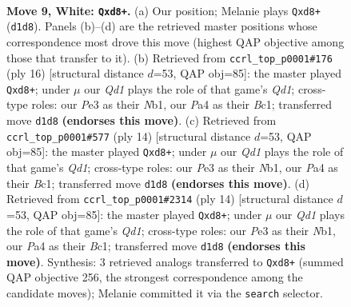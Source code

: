 \documentclass[11pt]{article}
\begin{document}
\clearpage

\begin{figure}[p]\centering
\begin{subfigure}{0.46\textwidth}\centering
\resizebox{\linewidth}{!}{%
\newchessgame
\chessboard[
  setfen={rn1qkb1r/1p3ppp/p1b1pn2/2P5/P1B5/4PN2/1P3PPP/RNBQ1RK1 w kq - 1 9},
  showmover=false,
  pgfstyle=straightmove, color=movearrow, markmove={d1-d8}
]}
\caption{}
\end{subfigure}\hfill
\begin{subfigure}{0.46\textwidth}\centering
\resizebox{\linewidth}{!}{%
\newchessgame
\chessboard[
  setfen={rnbqk2r/1p3ppp/p3pn2/2b5/2B5/4PN2/PP3PPP/RNBQ1RK1 w kq - 0 9},
  showmover=false,
  pgfstyle=straightmove, color=movearrow, markmove={d1-d8}
]}
\caption{}
\end{subfigure}
\\[4pt]
\begin{subfigure}{0.46\textwidth}\centering
\resizebox{\linewidth}{!}{%
\newchessgame
\chessboard[
  setfen={rnbqk2r/1p3ppp/p3pn2/2b5/2B5/4PN2/PP3PPP/RNBQ1RK1 w kq - 0 8},
  showmover=false,
  pgfstyle=straightmove, color=movearrow, markmove={d1-d8}
]}
\caption{}
\end{subfigure}\hfill
\begin{subfigure}{0.46\textwidth}\centering
\resizebox{\linewidth}{!}{%
\newchessgame
\chessboard[
  setfen={rnbqk2r/1p3ppp/p3pn2/2b5/2B5/4PN2/PP3PPP/RNBQ1RK1 w kq - 0 8},
  showmover=false,
  pgfstyle=straightmove, color=movearrow, markmove={d1-d8}
]}
\caption{}
\end{subfigure}
\caption{\textbf{Move 9, White: \texttt{Qxd8+}.} (a) Our position; Melanie plays \texttt{Qxd8+} (\texttt{d1d8}). Panels (b)--(d) are the retrieved master positions whose correspondence most drove this move (highest QAP objective among those that transfer to it). (b) Retrieved from \texttt{ccrl\_top\_p0001\#176} (ply 16) [structural distance $d$=53, QAP obj=85]: the master played \texttt{Qxd8+}; under $\mu$ our \emph{Qd1} plays the role of that game's \emph{Qd1}; cross-type roles: our \emph{P}e3 as their \emph{N}b1, our \emph{P}a4 as their \emph{B}c1; transferred move \texttt{d1d8} \textbf{(endorses this move)}. (c) Retrieved from \texttt{ccrl\_top\_p0001\#577} (ply 14) [structural distance $d$=53, QAP obj=85]: the master played \texttt{Qxd8+}; under $\mu$ our \emph{Qd1} plays the role of that game's \emph{Qd1}; cross-type roles: our \emph{P}e3 as their \emph{N}b1, our \emph{P}a4 as their \emph{B}c1; transferred move \texttt{d1d8} \textbf{(endorses this move)}. (d) Retrieved from \texttt{ccrl\_top\_p0001\#2314} (ply 14) [structural distance $d$=53, QAP obj=85]: the master played \texttt{Qxd8+}; under $\mu$ our \emph{Qd1} plays the role of that game's \emph{Qd1}; cross-type roles: our \emph{P}e3 as their \emph{N}b1, our \emph{P}a4 as their \emph{B}c1; transferred move \texttt{d1d8} \textbf{(endorses this move)}. Synthesis: 3 retrieved analogs transferred to \texttt{Qxd8+} (summed QAP objective 256, the strongest correspondence among the candidate moves); Melanie committed it via the \texttt{search} selector.}
\label{fig:thought-m16}
\end{figure}
\end{document}
